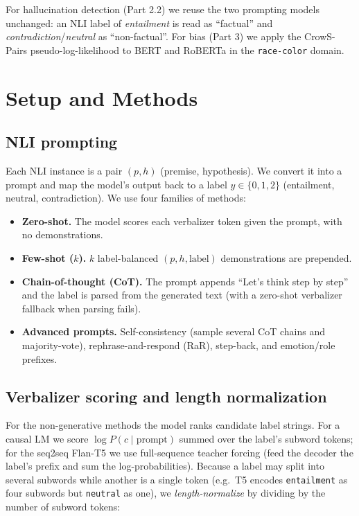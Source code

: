 \documentclass[11pt]{article}
\begin{document}
For hallucination detection (Part 2.2) we reuse the two prompting models unchanged: an NLI label of \emph{entailment} is read as ``factual'' and \emph{contradiction}/\emph{neutral} as ``non-factual''. For bias (Part 3) we apply the CrowS-Pairs pseudo-log-likelihood to BERT and RoBERTa in the \texttt{race-color} domain.

\section{Setup and Methods}

\subsection{NLI prompting}\label{sec:prompt}
Each NLI instance is a pair $(p, h)$ (premise, hypothesis). We convert it into a prompt and map the model's output back to a label $y\in\{0,1,2\}$ (entailment, neutral, contradiction). We use four families of methods:

\begin{itemize}[leftmargin=1.4em]
  \item \textbf{Zero-shot.} The model scores each verbalizer token given the prompt, with no demonstrations.
  \item \textbf{Few-shot ($k$).} $k$ label-balanced $(p,h,\text{label})$ demonstrations are prepended.
  \item \textbf{Chain-of-thought (CoT).} The prompt appends ``Let's think step by step'' and the label is parsed from the generated text (with a zero-shot verbalizer fallback when parsing fails).
  \item \textbf{Advanced prompts.} Self-consistency (sample several CoT chains and majority-vote), rephrase-and-respond (RaR), step-back, and emotion/role prefixes.
\end{itemize}

\subsection{Verbalizer scoring and length normalization}\label{sec:verbalizer}
For the non-generative methods the model ranks candidate label strings. For a causal LM we score $\log P(c \mid \text{prompt})$ summed over the label's subword tokens; for the seq2seq Flan-T5 we use full-sequence teacher forcing (feed the decoder the label's prefix and sum the log-probabilities). Because a label may split into several subwords while another is a single token (e.g.\ T5 encodes \texttt{entailment} as four subwords but \texttt{neutral} as one), we \emph{length-normalize} by dividing by the number of subword tokens:
\end{document}
